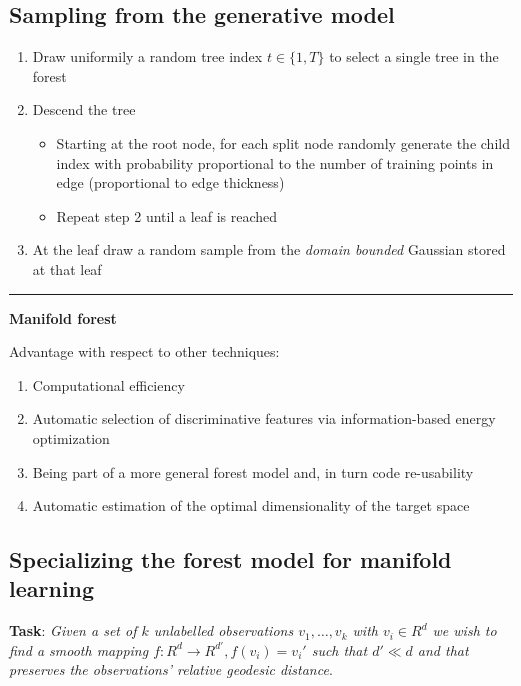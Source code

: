 \documentclass{scrartcl}
\begin{document}
\begin{appendices}
\subsection{Sampling from the generative model}
\begin{enumerate}
    \item
        Draw uniformily a random tree index \(t \in \{1, T\}\) to select a single tree in the forest
    \item
        Descend the tree
        \begin{itemize}
            \item
                Starting at the root node, for each split node randomly generate the child index with probability proportional to the number of training points in edge (proportional to edge thickness)
            \item
                Repeat step 2 until a leaf is reached
        \end{itemize}
    \item
        At the leaf draw a random sample from the \textit{domain bounded} Gaussian stored at that leaf
\end{enumerate}


\rule{\textwidth}{1pt}
\textbf{Manifold forest}

Advantage with respect to other techniques:
\begin{enumerate}
    \item
        Computational efficiency
    \item
        Automatic selection of discriminative features via information-based energy optimization
    \item
        Being part of a more general forest model and, in turn code re-usability
    \item
        Automatic estimation of the optimal dimensionality of the target space
\end{enumerate}

\subsection{Specializing the forest model for manifold learning}
\textbf{Task}: \textit{Given a set of \(k\) unlabelled observations \(v_1, \dots, v_k\) with \(v_i \in R^d\) we wish to find a smooth mapping \(f: R^d \rightarrow R^{d'}, f(v_i) = v_i'\) such that \(d' \ll d\) and that preserves the observations' relative geodesic distance}.

















\end{appendices}
\end{document}
